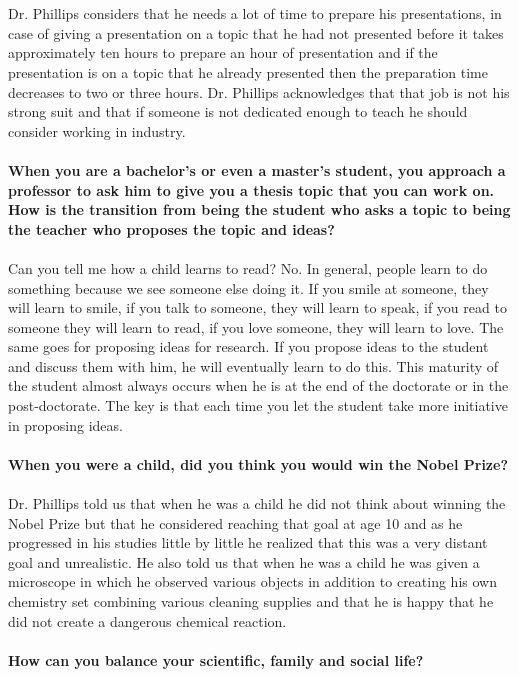 \documentclass[10pt,letterpaper]{article}
\begin{document}
\\
\\
Dr. Phillips considers that he needs a lot of time to prepare his presentations, in case of giving a presentation on a topic that he had not presented before it takes approximately ten hours to prepare an hour of presentation and if the presentation is on a topic that he already presented then the preparation time decreases to two or three hours. Dr. Phillips acknowledges that that job is not his strong suit and that if someone is not dedicated enough to teach he should consider working in industry. 
\\
\\
\textbf{When you are a bachelor's or even a master's student, you approach a professor to ask him to give you a thesis topic that you can work on. How is the transition from being the student who asks a topic to being the teacher who proposes the topic and ideas?}
\\
\\
Can you tell me how a child learns to read? No. In general, people learn to do something because we see someone else doing it. If you smile at someone, they will learn to smile, if you talk to someone, they will learn to speak, if you read to someone they will learn to read, if you love someone, they will learn to love. The same goes for proposing ideas for research. If you propose ideas to the student and discuss them with him, he will eventually learn to do this. This maturity of the student almost always occurs when he is at the end of the doctorate or in the post-doctorate. The key is that each time you let the student take more initiative in proposing ideas.
\\
\\
\textbf{When you were a child, did you think you would win the Nobel Prize?}
\\
\\
Dr. Phillips told us that when he was a child he did not think about winning the Nobel Prize but that he considered reaching that goal at age 10 and as he progressed in his studies little by little he realized that this was a very distant goal and unrealistic. He also told us that when he was a child he was given a microscope in which he observed various objects in addition to creating his own chemistry set combining various cleaning supplies and that he is happy that he did not create a dangerous chemical reaction.
\\
\\
\textbf{How can you balance your scientific, family and social life?}
\end{document}
